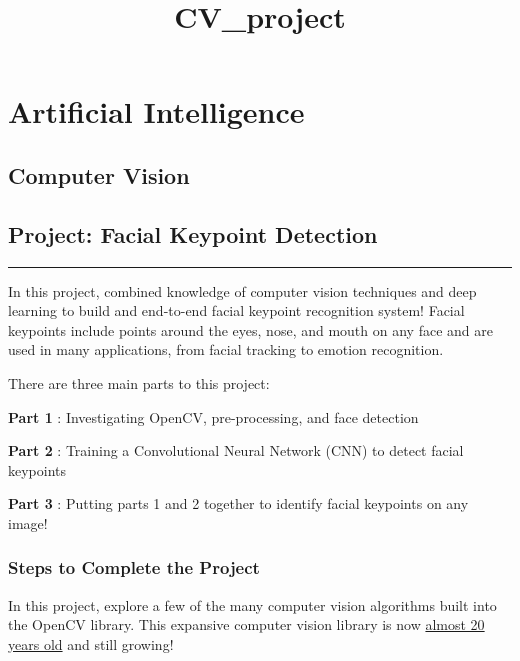 \documentclass[11pt]{article}
\title{CV\_project}
\begin{document}
    
    
    \maketitle
    
    

    
    \section{Artificial Intelligence}\label{artificial-intelligence}

\subsection{Computer Vision}\label{computer-vision}

\subsection{Project: Facial Keypoint
Detection}\label{project-facial-keypoint-detection}

\begin{center}\rule{0.5\linewidth}{\linethickness}\end{center}

In this project, combined knowledge of computer vision techniques and
deep learning to build and end-to-end facial keypoint recognition
system! Facial keypoints include points around the eyes, nose, and mouth
on any face and are used in many applications, from facial tracking to
emotion recognition.

There are three main parts to this project:

\textbf{Part 1} : Investigating OpenCV, pre-processing, and face
detection

\textbf{Part 2} : Training a Convolutional Neural Network (CNN) to
detect facial keypoints

\textbf{Part 3} : Putting parts 1 and 2 together to identify facial
keypoints on any image!

    \subsubsection{Steps to Complete the
Project}\label{steps-to-complete-the-project}

In this project, explore a few of the many computer vision algorithms
built into the OpenCV library. This expansive computer vision library is
now \href{https://en.wikipedia.org/wiki/OpenCV\#History}{almost 20 years
old} and still growing!
\end{document}
